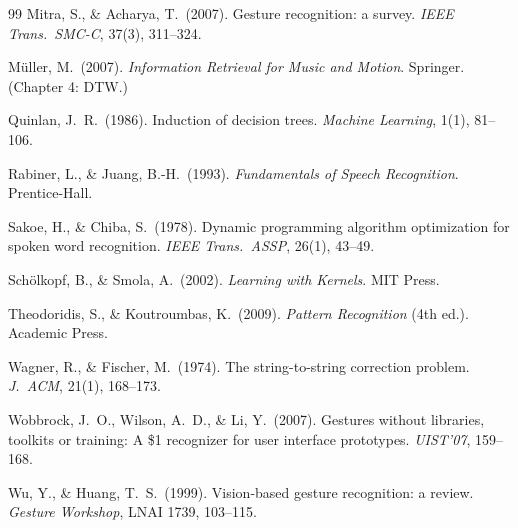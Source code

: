 \documentclass[11pt,a4paper]{article}
\begin{document}
\begin{thebibliography}{99}
Mitra, S., \& Acharya, T.\ (2007). Gesture recognition: a survey.
\textit{IEEE Trans.\ SMC-C}, 37(3), 311--324.

M\"uller, M.\ (2007). \textit{Information Retrieval for Music and
Motion}. Springer. (Chapter 4: DTW.)

Quinlan, J.~R.\ (1986). Induction of decision trees.
\textit{Machine Learning}, 1(1), 81--106.

Rabiner, L., \& Juang, B.-H.\ (1993). \textit{Fundamentals of Speech
Recognition}. Prentice-Hall.

Sakoe, H., \& Chiba, S.\ (1978). Dynamic programming algorithm
optimization for spoken word recognition. \textit{IEEE Trans.\
ASSP}, 26(1), 43--49.

Sch\"olkopf, B., \& Smola, A.\ (2002). \textit{Learning with Kernels}.
MIT Press.

Theodoridis, S., \& Koutroumbas, K.\ (2009). \textit{Pattern
Recognition} (4th ed.). Academic Press.

Wagner, R., \& Fischer, M.\ (1974). The string-to-string correction
problem. \textit{J.\ ACM}, 21(1), 168--173.

Wobbrock, J.~O., Wilson, A.~D., \& Li, Y.\ (2007). Gestures without
libraries, toolkits or training: A \$1 recognizer for user interface
prototypes. \textit{UIST'07}, 159--168.

Wu, Y., \& Huang, T.~S.\ (1999). Vision-based gesture recognition: a
review. \textit{Gesture Workshop}, LNAI 1739, 103--115.

\end{thebibliography}
\end{document}
